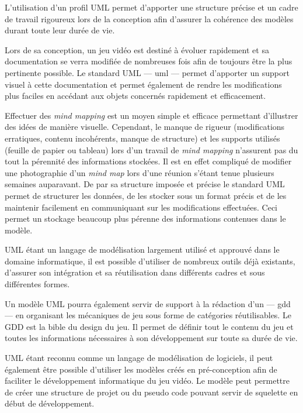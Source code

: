 L'utilisation d'un profil UML permet d'apporter une structure précise et un cadre de travail rigoureux lors de la conception afin d'assurer la cohérence des modèles durant toute leur durée de vie.

Lors de sa conception, un jeu vidéo est destiné à évoluer rapidement et sa documentation se verra modifiée de nombreuses fois afin de toujours être la plus pertinente possible. Le standard UML --- \gls{uml} --- permet d'apporter un support visuel à cette documentation et permet également de rendre les modifications plus faciles en accédant aux objets concernés rapidement et efficacement. 

Effectuer des \emph{mind mapping} est un moyen simple et efficace permettant d'illustrer des idées de manière visuelle. Cependant, le manque de rigueur (modifications erratiques, contenu incohérents, manque de structure) et les supports utilisés (feuille de papier ou tableau) lors d'un travail de \emph{mind mapping} n'assurent pas du tout la pérennité des informations stockées. Il est en effet compliqué de modifier une photographie d'un \emph{mind map} lors d'une réunion s'étant tenue plusieurs semaines auparavant. De par sa structure imposée et précise le standard UML permet de structurer les données, de les stocker sous un format précis et de les maintenir facilement en communiquant sur les modifications effectuées. Ceci permet un stockage beaucoup plus pérenne des informations contenues dans le modèle.

UML étant un langage de modélisation largement utilisé et approuvé dans le domaine informatique, il est possible d'utiliser de nombreux outils d\'ej\`a existants, d'assurer son intégration et sa réutilisation dans différents cadres et sous différentes formes.

Un modèle UML pourra également servir de support à la rédaction d'un --- \gls{gdd} --- en organisant les mécaniques de jeu sous forme de catégories réutilisables. Le GDD est la \guillemotleft bible du design \guillemotright \cite{GD_foundations_pedersen} du jeu. Il permet de définir tout le contenu du jeu et toutes les informations nécessaires à son développement sur toute sa durée de vie. 

UML étant reconnu comme un langage de modélisation de logiciels, il peut également être possible d'utiliser les modèles créés en pré-conception afin de faciliter le développement informatique du jeu vidéo. Le modèle peut permettre de créer une structure de projet ou du pseudo code pouvant servir de squelette en début de développement.


